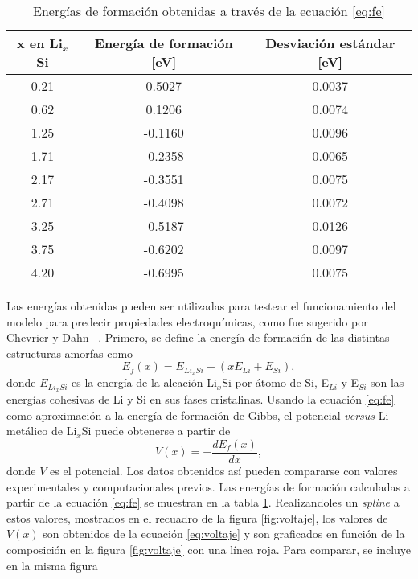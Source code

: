 \begin{table}[h]
    \centering
    \caption{Energías de formación obtenidas a través de la ecuación \ref{eq:fe}}
    \begin{tabular}{ccc}
    \hline
    x en Li$_x$Si & Energía de formación [eV] & Desviación estándar [eV]\\
    \hline
    0.21  &  0.5027  &  0.0037 \\
    0.62  &  0.1206  &  0.0074 \\
    1.25  & -0.1160  &  0.0096 \\
    1.71  & -0.2358  &  0.0065 \\
    2.17  & -0.3551  &  0.0075 \\
    2.71  & -0.4098  &  0.0072 \\
    3.25  & -0.5187  &  0.0126 \\
    3.75  & -0.6202  &  0.0097 \\
    4.20  & -0.6995  &  0.0075 \\
    \hline
    \end{tabular}
    \label{t:fe}
\end{table}
Las energías obtenidas pueden ser utilizadas para testear el funcionamiento del 
modelo para predecir propiedades electroquímicas, como fue sugerido por Chevrier
y Dahn ~\cite{chevrier2009}. Primero, se define la energía de formación de las 
distintas estructuras amorfas como
\begin{equation}\label{eq:fe}
    E_f(x) = E_{Li_xSi} - (x E_{Li} + E_{Si}),
\end{equation}
donde $E_{Li_xSi}$ es la energía de la aleación Li$_x$Si por átomo de Si, E$_{Li}$
y E$_{Si}$ son las energías cohesivas de Li y Si en sus fases cristalinas. Usando
la ecuación \ref{eq:fe} como aproximación a la energía de formación de Gibbs, el 
potencial \textit{versus} Li metálico de Li$_x$Si puede obtenerse a partir de
\begin{equation}\label{eq:voltaje}
    V(x) = - \frac{dE_f(x)}{dx},
\end{equation}
donde $V$ es el potencial. Los datos obtenidos así pueden compararse con valores
experimentales y computacionales previos. Las energías de formación calculadas
a partir de la ecuación \ref{eq:fe} se muestran en la tabla \ref{t:fe}. 
Realizandoles un \textit{spline} a estos valores, mostrados en el recuadro de la
figura \ref{fig:voltaje}, los valores de $V(x)$ son obtenidos de la ecuación
\ref{eq:voltaje} y son graficados en función de la composición en la figura 
\ref{fig:voltaje} con una línea roja. Para comparar, se incluye en la misma figura
